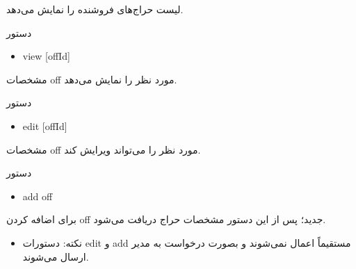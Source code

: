 \documentclass[]{article}
\begin{document}
لیست حراج‌های فروشنده را نمایش می‌دهد.


\begin{mybox}[colback=brilliantlavender]{دستور}

\begin{latin}

\begin{itemize}[label = {$\Rightarrow$}]

\item
view [offId]

\end{itemize}

\end{latin}

\end{mybox}

مشخصات off مورد نظر را نمایش می‌دهد.



\begin{mybox}[colback=brilliantlavender]{دستور}

\begin{latin}

\begin{itemize}[label = {$\Rightarrow$}]

\item
edit [offId]

\end{itemize}

\end{latin}

\end{mybox}

مشخصات off مورد نظر را می‌تواند ویرایش کند.


\begin{mybox}[colback=brilliantlavender]{دستور}

\begin{latin}

\begin{itemize}[label = {$\Rightarrow$}]

\item
add off

\end{itemize}

\end{latin}

\end{mybox}

برای اضافه کردن off جدید؛ پس از این دستور مشخصات حراج دریافت می‌شود.

\begin{itemize}[label={$\blacksquare$}]
\item
نکته: دستورات edit و add مستقیماً اعمال نمی‌شوند و بصورت درخواست به مدیر ارسال می‌شوند.

\end{itemize}
\end{document}
